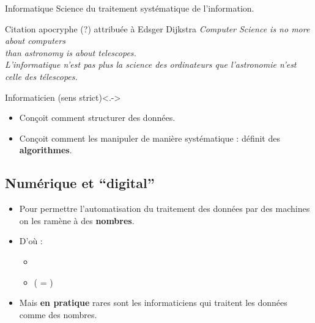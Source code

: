 \begin{slide}

	
	
	\begin{block}{Informatique}
	Science du traitement systématique de l'information.
	\end{block}
	
	
	\begin{exampleblock}{Citation apocryphe (?) attribuée à Edsger Dijkstra}%
        \it
	Computer Science is no more about computers \\
        than astronomy is about telescopes.\\
	
        \medskip
	L'informatique n'est pas plus la science des ordinateurs que l'astronomie n'est celle des télescopes.
	\end{exampleblock}
	
\end{slide}

\begin{slide}
	\begin{block}{Informaticien (sens strict)}<.->
		\begin{itemize}
			\item Conçoit comment structurer des données.
			\item Conçoit comment les manipuler de manière systématique : définit des \textbf{algorithmes}.
		\end{itemize}
	\end{block}
\end{slide}
\subsection{Numérique et \enquote{digital}}

\begin{slide}

	\begin{itemize}
		\item Pour permettre l'automatisation du traitement des données par des machines on les ramène à des \textbf{nombres}.
		\item D'où :
			\begin{itemize}
				\item {}
				\item {} ( = )
			\end{itemize}
		\item Mais \textbf{en pratique} rares sont les informaticiens qui traitent les données comme des nombres. 
	\end{itemize}
\end{slide}

